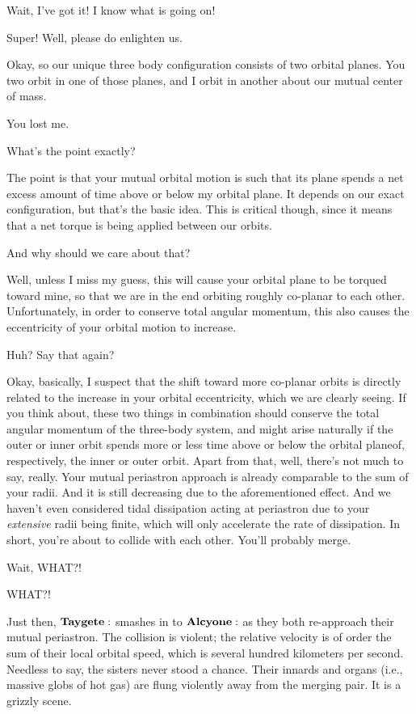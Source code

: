 \Celaeno  Wait, I've got it!  I know what is going on!

\Taygete  Super!  Well, please do enlighten us.

\Celaeno  Okay, so our unique three body configuration consists of two orbital planes.  You two orbit in one of those planes, and I orbit in another about our mutual center of mass.

\Alcyone  You lost me.

\Taygete What's the point exactly?

\Celaeno The point is that your mutual orbital motion is such that its plane spends a net excess amount of time above or below my orbital plane.  It depends on our exact configuration, but that's the basic idea.  This is critical though, since it means that a net torque is being applied between our orbits.

\Alcyone And why should we care about that?

\Celaeno Well, unless I miss my guess, this will cause your orbital plane to be torqued toward mine, so that we are in the end orbiting roughly co-planar to each other.  Unfortunately, in order to conserve total angular momentum, this also causes the eccentricity of your orbital motion to increase.  

\Taygete  Huh?  Say that again?

\Celaeno Okay, basically, I suspect that the shift toward more co-planar orbits is directly related to the increase in your orbital eccentricity, which we are clearly seeing.  If you think about, these two things in combination should conserve the total angular momentum of the three-body system, and might arise naturally if the outer or inner orbit spends more or less time above or below the orbital planeof, respectively, the inner or outer orbit.  Apart from that, well, there's not much to say, really.  Your mutual periastron approach is already comparable to the sum of your radii.  And it is still decreasing due to the aforementioned effect.  And we haven't even considered tidal dissipation acting at periastron due to your \textit{extensive} radii being finite, which will only accelerate the rate of dissipation.  In short, you're about to collide with each other.  You'll probably merge.

\Taygete  Wait, WHAT?!

\Alcyone  WHAT?!

Just then, $\Taygete$ smashes in to $\Alcyone$ as they both re-approach their mutual periastron.  The collision is violent; the relative velocity is of order the sum of their local orbital speed, which is several hundred kilometers per second.  Needless to say, the sisters never stood a chance.  Their innards and organs (i.e., massive globs of hot gas) are flung violently away from the merging pair.  It is a grizzly scene.

